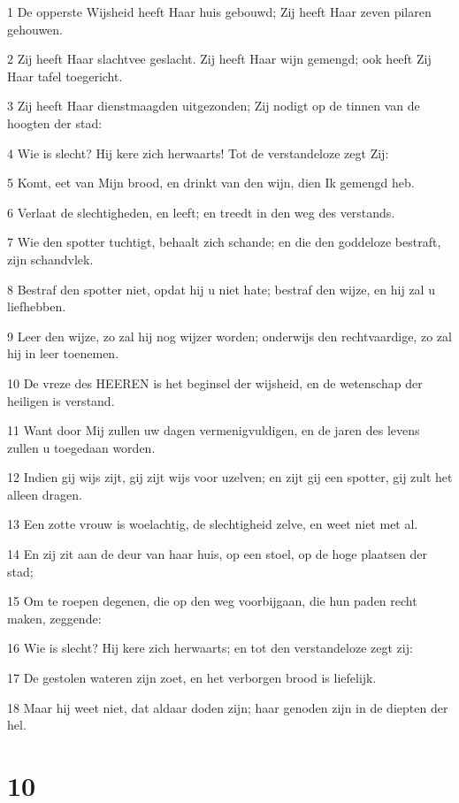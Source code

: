 \par 1 De opperste Wijsheid heeft Haar huis gebouwd; Zij heeft Haar zeven pilaren gehouwen.
\par 2 Zij heeft Haar slachtvee geslacht. Zij heeft Haar wijn gemengd; ook heeft Zij Haar tafel toegericht.
\par 3 Zij heeft Haar dienstmaagden uitgezonden; Zij nodigt op de tinnen van de hoogten der stad:
\par 4 Wie is slecht? Hij kere zich herwaarts! Tot de verstandeloze zegt Zij:
\par 5 Komt, eet van Mijn brood, en drinkt van den wijn, dien Ik gemengd heb.
\par 6 Verlaat de slechtigheden, en leeft; en treedt in den weg des verstands.
\par 7 Wie den spotter tuchtigt, behaalt zich schande; en die den goddeloze bestraft, zijn schandvlek.
\par 8 Bestraf den spotter niet, opdat hij u niet hate; bestraf den wijze, en hij zal u liefhebben.
\par 9 Leer den wijze, zo zal hij nog wijzer worden; onderwijs den rechtvaardige, zo zal hij in leer toenemen.
\par 10 De vreze des HEEREN is het beginsel der wijsheid, en de wetenschap der heiligen is verstand.
\par 11 Want door Mij zullen uw dagen vermenigvuldigen, en de jaren des levens zullen u toegedaan worden.
\par 12 Indien gij wijs zijt, gij zijt wijs voor uzelven; en zijt gij een spotter, gij zult het alleen dragen.
\par 13 Een zotte vrouw is woelachtig, de slechtigheid zelve, en weet niet met al.
\par 14 En zij zit aan de deur van haar huis, op een stoel, op de hoge plaatsen der stad;
\par 15 Om te roepen degenen, die op den weg voorbijgaan, die hun paden recht maken, zeggende:
\par 16 Wie is slecht? Hij kere zich herwaarts; en tot den verstandeloze zegt zij:
\par 17 De gestolen wateren zijn zoet, en het verborgen brood is liefelijk.
\par 18 Maar hij weet niet, dat aldaar doden zijn; haar genoden zijn in de diepten der hel.

\chapter{10}

